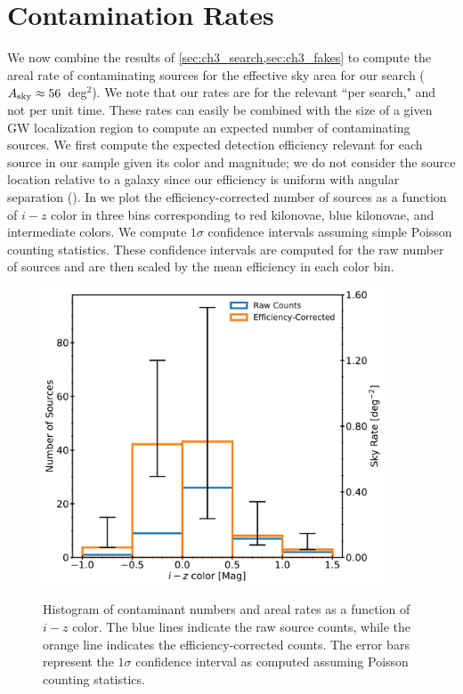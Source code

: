 \section{Contamination Rates}
\label{sec:ch3_contam_rates}
We now combine the results of \cref{sec:ch3_search,sec:ch3_fakes} to compute the areal rate of contaminating sources for the effective sky area for our search ($A_{\rm sky} \approx56$~deg$^2$). We note that our rates are for the relevant ``per search," and not per unit time. These rates can easily be combined with the size of a given GW localization region to compute an expected number of contaminating sources. We first compute the expected detection efficiency relevant for each source in our sample given its color and magnitude; we do not consider the source location relative to a galaxy since our efficiency is uniform with angular separation (). In  we plot the efficiency-corrected number of sources as a function of $i-z$ color in three bins corresponding to red kilonovae, blue kilonovae, and intermediate colors. We compute $1\sigma$ confidence intervals assuming simple Poisson counting statistics. These confidence intervals are computed for the raw number of sources and are then scaled by the mean efficiency in each color bin.

\begin{figure}[!t]
\begin{center}
\hspace*{-0.1in}
\scalebox{1.}
{\includegraphics[width=0.9\textwidth]{./figs/chapter3/f8.pdf}}
\caption{Histogram of contaminant numbers and areal rates as a function of $i-z$ color. The blue lines indicate the raw source counts, while the orange line indicates the efficiency-corrected counts. The error bars represent the $1\sigma$ confidence interval as computed assuming Poisson counting statistics.}
\label{fig:ch3_color_dist_corr}
\end{center}
\end{figure}

